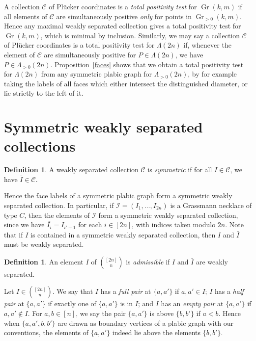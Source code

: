 \documentclass[10pt]{amsart}
\theoremstyle{definition}
\newtheorem{defi}[theo]{Definition}
\DeclareMathOperator{\Gr}{Gr}
\newcommand{\Lm}{\Lambda}
\begin{document}
A collection $\mathcal{C}$ of Pl{\"u}cker coordinates is a \emph{total positivity test} for $\Gr(k,m)$ if all elements of $\mathcal{C}$ are simultaneously positive \emph{only} for points in $\Gr_{> 0}(k,m)$.
Hence any maximal weakly separated collection gives a total positivity test for $\Gr(k,m)$, which is minimal by inclusion. Similarly, we may say a collection $\mathcal{C}$ of Pl{\"u}cker coordinates is a total positivity test for $\Lm(2n)$ if, whenever the element of $\mathcal{C}$ are simultaneously positive for $P \in \Lm(2n)$, we have $P \in \Lm_{>0}(2n)$. Proposition~\ref{faces} shows that we obtain a total positivity test for $\Lm(2n)$ from any symmetric plabic graph for $\Lm_{>0}(2n)$, by for example taking the labels of all faces which either intersect the distinguished diameter, or lie strictly to the left of it. 

\section{Symmetric weakly separated collections}
\label{sym_sep}

\begin{defi}
A weakly separated collection $\mathcal{C}$ is \emph{symmetric} if for all $I \in \mathcal{C}$, we have $\bar{I} \in \mathcal{C}$.
\end{defi}

Hence the face labels of a symmetric plabic graph form a symmetric weakly separated collection. In particular, if $\mathcal{I}=(I_1,\ldots,I_{2n})$ is a Grassmann necklace of type $C$, then the elements of $\mathcal{I}$ form a symmetric weakly separated collection, since we have $\overline{I_i} = I_{i' + 1}$ for each $i \in [2n]$, with indices taken modulo $2n$. Note that if $I$ is contained in a symmetric weakly separated collection, then $I$ and $\bar{I}$ must be weakly separated.

\begin{defi}
An element $I$ of $\binom{[2n]}{n}$ is \emph{admissible} if $I$ and $\bar{I}$ are weakly separated.
\end{defi} 

Let $I \in \binom{[2n]}{n}$. We say that $I$ has a \emph{full pair} at $\{a,a'\}$ if $a,a' \in I$; $I$ has a \emph{half pair} at
 $\{a,a'\}$ if exactly one of
 $\{a,a'\}$ is in $I$; and $I$ has an \emph{empty pair} at
 $\{a,a'\}$ if $a,a' \not\in I$. 
 For $a,b \in [n]$, we say the pair $\{a,a'\}$ is above $\{b,b'\}$ if $a < b$. Hence when $\{a,a',b,b'\}$ are drawn as boundary vertices of a plabic graph with our conventions, the elements of
 $\{a,a'\}$ indeed lie above the elements $\{b,b'\}$. 
\end{document}
